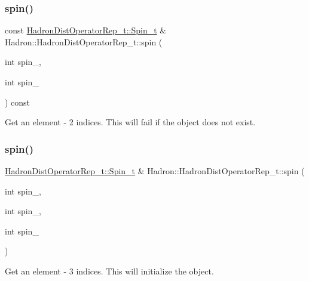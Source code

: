 \subsubsection{\texorpdfstring{spin()}{spin()}\hspace{0.1cm}{\footnotesize\ttfamily [4/16]}}
{\footnotesize\ttfamily const \mbox{\hyperlink{structHadron_1_1HadronDistOperatorRep__t_1_1Spin__t}{Hadron\+Dist\+Operator\+Rep\+\_\+t\+::\+Spin\+\_\+t}} \& Hadron\+::\+Hadron\+Dist\+Operator\+Rep\+\_\+t\+::spin (\begin{DoxyParamCaption}\item[{int}]{spin\+\_,  }\item[{int}]{spin\+\_ }\end{DoxyParamCaption}) const}



Get an element -\/ 2 indices. This will fail if the object does not exist. 

\mbox{\label{classHadron_1_1HadronDistOperatorRep__t_a215985252fdaecbbecab777de4591cd4}} 
\subsubsection{\texorpdfstring{spin()}{spin()}\hspace{0.1cm}{\footnotesize\ttfamily [5/16]}}
{\footnotesize\ttfamily \mbox{\hyperlink{structHadron_1_1HadronDistOperatorRep__t_1_1Spin__t}{Hadron\+Dist\+Operator\+Rep\+\_\+t\+::\+Spin\+\_\+t}} \& Hadron\+::\+Hadron\+Dist\+Operator\+Rep\+\_\+t\+::spin (\begin{DoxyParamCaption}\item[{int}]{spin\+\_,  }\item[{int}]{spin\+\_,  }\item[{int}]{spin\+\_ }\end{DoxyParamCaption})}



Get an element -\/ 3 indices. This will initialize the object. 

\mbox{\label{classHadron_1_1HadronDistOperatorRep__t_a16cb713c1d0591585af379b01467696c}} 
